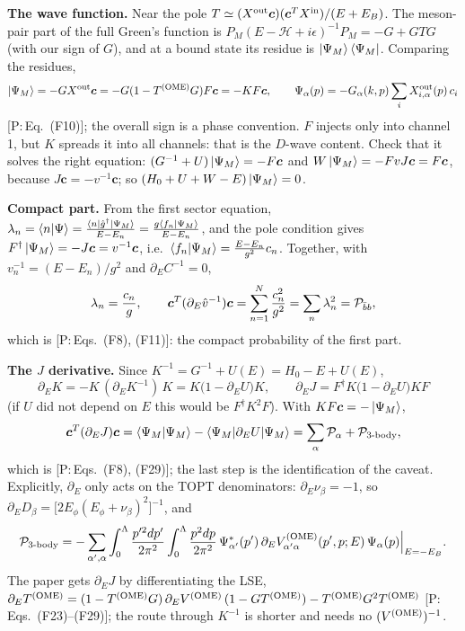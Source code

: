 \documentclass[11pt,a4paper]{article}
\newcommand{\tagP}[1]{\textcolor{blue!65!black}{\textsf{\small[P:\,#1]}}}
\renewcommand{\VOME}{V^{\rm (OME)}}
\renewcommand{\TOME}{T^{\rm (OME)}}
\newcommand{\Pbb}{{\cal P}_{\bar bb}}
\newenvironment{aiadd}{\par}{\par}
\begin{document}
\begin{aiadd}
	\textbf{The wave function.} Near the pole $T\simeq(X^{\rm out}\bm c)(\bm c^TX^{\rm in})/(E+E_B)$. The meson-pair part of the full Green's function is $P_M(E-\mathcal H+i\epsilon)^{-1}P_M=-G+GTG$ (with our sign of $G$), and at a bound state its residue is $\ket{\Psi_M}\bra{\Psi_M}$. Comparing the residues,
	\[
		\ket{\Psi_M}=-GX^{\rm out}\bm c=-G(1-\TOME G)F\bm c=-KF\bm c,\qquad
		\Psi_\alpha(p)=-G_\alpha(k,p)\sum_iX^{\rm out}_{i,\alpha}(p)\,c_i
	\]
	\tagP{Eq.~(F10)}; the overall sign is a phase convention. $F$ injects only into channel 1, but $K$ spreads it into all channels: that is the $D$-wave content. Check that it solves the right equation: $(G^{-1}+U)\ket{\Psi_M}=-F\bm c$ and $W\ket{\Psi_M}=-FvJ\bm c=F\bm c$, because $J\bm c=-v^{-1}\bm c$; so $(H_0+U+W-E)\ket{\Psi_M}=0$.

	\textbf{Compact part.} From the first sector equation, $\lambda_n=\braket{n|\Psi}=\frac{\braket{n|\hat g^\dagger|\Psi_M}}{E-E_n}=\frac{g\braket{f_n|\Psi_M}}{E-E_n}$, and the pole condition gives $F^\dagger\ket{\Psi_M}=-J\bm c=v^{-1}\bm c$, i.e.\ $\braket{f_n|\Psi_M}=\frac{E-E_n}{g^2}c_n$. Together, with $v_n^{-1}=(E-E_n)/g^2$ and $\partial_EC^{-1}=0$,
	\[
		\lambda_n=\frac{c_n}{g},\qquad
		\bm c^T(\partial_E\hat v^{-1})\bm c=\sum_{n=1}^N\frac{c_n^2}{g^2}=\sum_n\lambda_n^2=\Pbb,
	\]
	which is \tagP{Eqs.~(F8), (F11)}: the compact probability of the first part.

	\textbf{The $J$ derivative.} Since $K^{-1}=G^{-1}+U(E)=H_0-E+U(E)$,
	\[
		\partial_EK=-K\,(\partial_EK^{-1})\,K=K\big(1-\partial_EU\big)K,\qquad
		\partial_EJ=F^\dagger K\big(1-\partial_EU\big)KF
	\]
	(if $U$ did not depend on $E$ this would be $F^\dagger K^2F$). With $KF\bm c=-\ket{\Psi_M}$,
	\[
		\bm c^T(\partial_EJ)\bm c=\braket{\Psi_M|\Psi_M}-\braket{\Psi_M|\partial_EU|\Psi_M}=\sum_\alpha\mathcal P_\alpha+\mathcal P_{\text{3-body}},
	\]
	which is \tagP{Eqs.~(F8), (F29)}; the last step is the identification of the caveat. Explicitly, $\partial_E$ only acts on the TOPT denominators: $\partial_E\nu_\beta=-1$, so $\partial_ED_\beta=\big[2E_\phi(E_\phi+\nu_\beta)^2\big]^{-1}$, and
	\[
		\mathcal P_{\text{3-body}}=-\sum_{\alpha',\alpha}\int_0^\Lambda\frac{p'^2dp'}{2\pi^2}\int_0^\Lambda\frac{p^2dp}{2\pi^2}\,\Psi^*_{\alpha'}(p')\,\partial_E\VOME_{\alpha'\alpha}(p',p;E)\,\Psi_\alpha(p)\Big|_{E=-E_B}.
	\]
	The paper gets $\partial_EJ$ by differentiating the LSE, $\partial_E\TOME=(1-\TOME G)\,\partial_E\VOME\,(1-G\TOME)-\TOME G^2\TOME$ \tagP{Eqs.~(F23)--(F29)}; the route through $K^{-1}$ is shorter and needs no $(\VOME)^{-1}$.


\end{aiadd}
\end{document}
